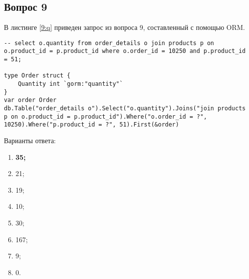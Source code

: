 \begin{appendices}
%
%
%
%
%

\section{Вопрос 9}

В листинге \ref{9:q} приведен запрос из вопроса 9, составленный с помощью ORM.

\begin{lstlisting}[label=9:q,caption=Вопрос 9]
-- select o.quantity from order_details o join products p on o.product_id = p.product_id where o.order_id = 10250 and p.product_id = 51;

type Order struct {
	Quantity int `gorm:"quantity"`
}
var order Order
db.Table("order_details o").Select("o.quantity").Joins("join products p on o.product_id = p.product_id").Where("o.order_id = ?", 10250).Where("p.product_id = ?", 51).First(&order)
\end{lstlisting}

Варианты ответа:

\begin{enumerate}
	\item \textbf{35;}
	\item 21;
	\item 19;
	\item 10;
	\item 30;
	\item 167;
	\item 9;
	\item 0.
\end{enumerate}


\end{appendices}
